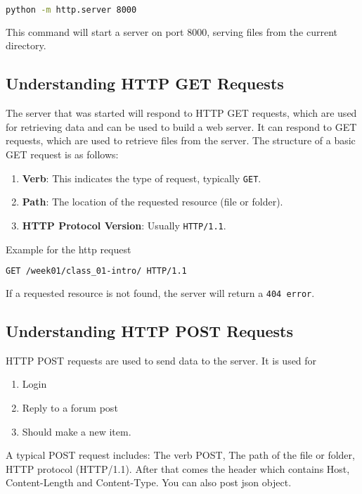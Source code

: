\begin{lstlisting}[language=bash, caption=Running the http.server]
python -m http.server 8000
\end{lstlisting}

This command will start a server on port 8000, serving files from the current directory.

\subsection{Understanding HTTP GET Requests}
The server that was started will respond to HTTP GET requests, which are used for retrieving data and can be used to build a web server.
It can respond to GET requests, which are used to retrieve files from the server. The structure of a basic GET request is as follows:

\begin{enumerate}[label=\alph*), itemsep=1pt]
    \item \textbf{Verb}: This indicates the type of request, typically \texttt{GET}.
    \item \textbf{Path}: The location of the requested resource (file or folder).
    \item \textbf{HTTP Protocol Version}: Usually \texttt{HTTP/1.1}.
\end{enumerate}

\begin{example}{Example for the http request}
\begin{lstlisting}[language=html, caption=Example]
GET /week01/class_01-intro/ HTTP/1.1
\end{lstlisting}
If a requested resource is not found, the server will return a \texttt{404 error}.
\end{example}

\subsection{Understanding HTTP POST Requests}
HTTP POST requests are used to send data to the server. It is used for 
\begin{enumerate}[label=\roman*), noitemsep]
	\item Login
	\item Reply to a forum post
	\item Should make a new item.
\end{enumerate}
 A typical POST request includes: The verb POST, The path of the file or folder, HTTP protocol (HTTP/1.1).
After that comes the header which contains Host, Content-Length and Content-Type. You can also post json object.


